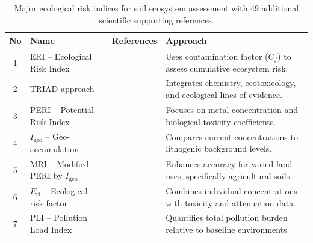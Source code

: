 \documentclass[sn-mathphys-num]{sn-jnl}
\begin{document}
\begin{table}[htbp]
\centering
\caption{Major ecological risk indices for soil ecosystem assessment with 49 additional scientific supporting references.}
\label{tab2_expanded}
\begin{tabularx}{\textwidth}{@{} c p{3cm} X p{5cm} @{}}
\toprule
\textbf{No} & \textbf{Name} & \textbf{References} & \textbf{Approach} \\
\midrule
1 & ERI -- Ecological Risk Index & \cite{Wang2025, Egbueri2020, Adewumi2024, ElSorogy2025, Sidoruk2023, Siddig2025, Fan2025, Proshad2025, AnsoarRodriguez2025} & Uses contamination factor ($C_f$) to assess cumulative ecosystem risk. \\[4pt]
2 & TRIAD approach & \cite{Kim2024, Chon2011, LindhLemenkova2023b, Rasafi2021, Stojic2019, Mohammad2025, Toumi2025, Yasir2025} & Integrates chemistry, ecotoxicology, and ecological lines of evidence. \\[4pt]
3 & PERI -- Potential Risk Index & \cite{AnsoarRodriguez2025, Ferreira2022, Li2025a, Sidoruk2023, Siddig2025, Li2020, Wang2024a, Wang2025} & Focuses on metal concentration and biological toxicity coefficients. \\[4pt]
4 & $I_{\mathrm{geo}}$ -- Geo-accumulation & \cite{Li2014, ElSorogy2025, Wang2020, Sidoruk2023, Siddig2025, AliZerrouki2021, LindhLemenkova2022a, Racic2025} & Compares current concentrations to lithogenic background levels. \\[4pt]
5 & MRI -- Modified PERI by $I_{\mathrm{geo}}$ & \cite{Liu2021, Ferreira2022, Siddig2025, Li2019, Adewumi2024, Wang2024a, Wang2025, Proshad2025} & Enhances accuracy for varied land uses, specifically agricultural soils. \\[4pt]
6 & $E_{\mathrm{rf}}$ -- Ecological risk factor & \cite{Li2025a, Liu2021, Shetty2025, Marthandan2020, Sun2025, Sun2025, Sun2025, Sidoruk2023} & Combines individual concentrations with toxicity and attenuation data. \\[4pt]
7 & PLI -- Pollution Load Index & \cite{Li2022b, Chukwuonye2025, Wan2019, Mukhopadhyay2020, Sidoruk2023, Li2020, Wang2020, ElSorogy2025} & Quantifies total pollution burden relative to baseline environments. \\
\bottomrule
\end{tabularx}
\end{table}
\end{document}
